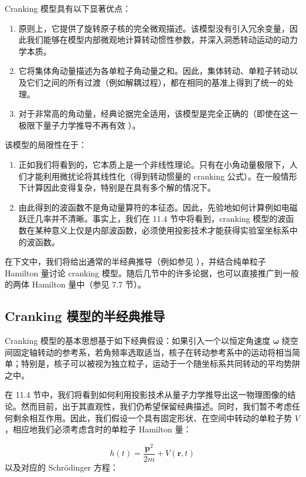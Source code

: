 Cranking 模型具有以下显著优点：
\begin{enumerate}
\item[(i)] 原则上，它提供了旋转原子核的完全微观描述。该模型没有引入冗余变量，因此我们能够在模型内部微观地计算转动惯性参数，并深入洞悉转动运动的动力学本质。
\item[(ii)] 它将集体角动量描述为各单粒子角动量之和。因此，集体转动、单粒子转动以及它们之间的所有过渡（例如解耦过程），都在相同的基准上得到了统一的处理。
\item[(iii)] 对于非常高的角动量，经典论据完全适用，该模型是完全正确的（即使在这一极限下量子力学推导不再有效 \cite{BMR70}）。
\end{enumerate}
该模型的局限性在于：
\begin{enumerate}
\item[(i)] 正如我们将看到的，它本质上是一个非线性理论。只有在小角动量极限下，人们才能利用微扰论将其线性化（得到转动惯量的 cranking
公式）。在一般情形下计算因此变得复杂，特别是在具有多个解的情况下。
\item[(ii)] 由此得到的波函数不是角动量算符的本征态。因此，先验地如何计算例如电磁跃迁几率并不清晰。事实上，我们在 11.4 节中将看到，cranking
模型的波函数在某种意义上仅是内部波函数，必须使用投影技术才能获得实验室坐标系中的波函数。
\end{enumerate}
在下文中，我们将给出通常的半经典推导（例如参见 \cite{Vi57b,So73}），并结合纯单粒子 Hamilton 量讨论 cranking
模型。随后几节中的许多论据，也可以直接推广到一般的两体 Hamilton 量中（参见 7.7 节）。

\subsection{Cranking 模型的半经典推导}

Cranking 模型的基本思想基于如下经典假设：如果引入一个以恒定角速度 $\boldsymbol{\omega}$ 绕空间固定轴转动的参考系，若角频率选取适当，核子在转动参考系中的运动将相当简单；特别是，核子可以被视为独立粒子，运动于一个随坐标系共同转动的平均势阱之中。

在 11.4 节中，我们将看到如何利用投影技术从量子力学推导出这一物理图像的结论。然而目前，出于其直观性，我们仍希望保留经典描述。同时，我们暂不考虑任何剩余相互作用。因此，我们假设一个具有固定形状、在空间中转动的单粒子势
$V$，相应地我们必须考虑含时的单粒子 Hamilton 量：

\begin{equation}
h(t)=\frac{\boldsymbol{p}^{2}}{2m}+V(\boldsymbol{r},t)\label{eq:3.66}
\end{equation}
以及对应的 Schrödinger 方程：

